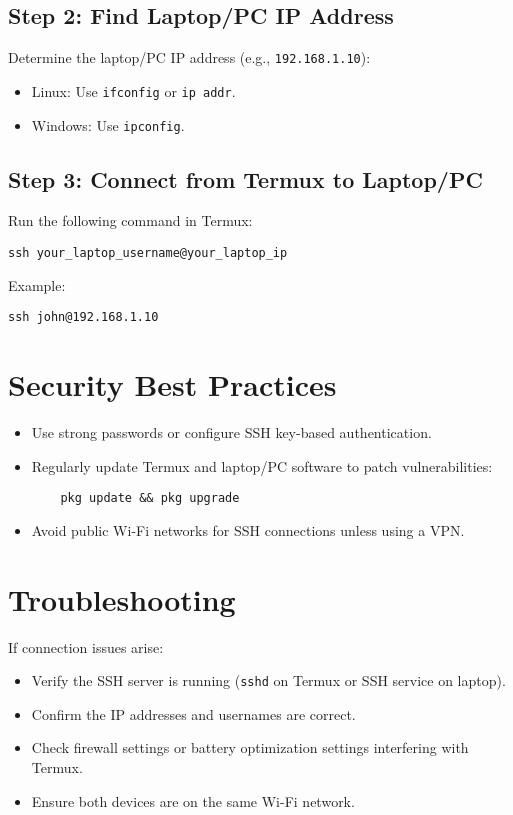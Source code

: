 \documentclass[conference]{IEEEtran}
\begin{document}
\subsection{Step 2: Find Laptop/PC IP Address}
Determine the laptop/PC IP address (e.g., \texttt{192.168.1.10}):
\begin{itemize}[leftmargin=*]
    \item Linux: Use \texttt{ifconfig} or \texttt{ip addr}.
    \item Windows: Use \texttt{ipconfig}.
\end{itemize}

\subsection{Step 3: Connect from Termux to Laptop/PC}
Run the following command in Termux:
\begin{verbatim}
ssh your_laptop_username@your_laptop_ip
\end{verbatim}
Example:  
\begin{verbatim}
ssh john@192.168.1.10
\end{verbatim}

\section{Security Best Practices}
\begin{itemize}[leftmargin=*]
    \item Use strong passwords or configure SSH key-based authentication.
    \item Regularly update Termux and laptop/PC software to patch vulnerabilities:
    \begin{verbatim}
    pkg update && pkg upgrade
    \end{verbatim}
    \item Avoid public Wi-Fi networks for SSH connections unless using a VPN.
\end{itemize}

\section{Troubleshooting}
If connection issues arise:
\begin{itemize}[leftmargin=*]
    \item Verify the SSH server is running (\texttt{sshd} on Termux or SSH service on laptop).
    \item Confirm the IP addresses and usernames are correct.
    \item Check firewall settings or battery optimization settings interfering with Termux.
    \item Ensure both devices are on the same Wi-Fi network.
\end{itemize}
\end{document}
